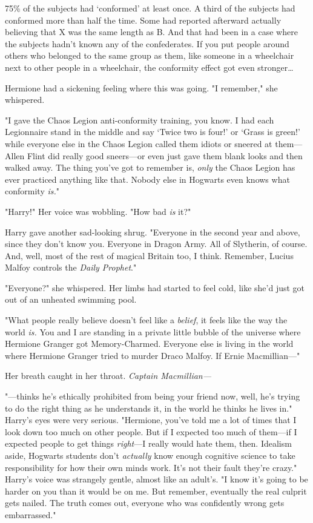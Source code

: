 75\% of the subjects had `conformed' at least once. A third of the subjects had
conformed more than half the time. Some had reported afterward actually
believing that X was the same length as B\@. And that had been in a case where
the subjects hadn't known any of the confederates. If you put people around
others who belonged to the same group as them, like someone in a wheelchair
next to other people in a wheelchair, the conformity effect got even
stronger{\ldots}

Hermione had a sickening feeling where this was going. "I remember," she
whispered.

"I gave the Chaos Legion anti-conformity training, you know. I had each
Legionnaire stand in the middle and say `Twice two is four!' or `Grass is
green!' while everyone else in the Chaos Legion called them idiots or sneered
at them---Allen Flint did really good sneers---or even just gave them blank
looks and then walked away. The thing you've got to remember is, \emph{only}
the Chaos Legion has ever practiced anything like that. Nobody else in Hogwarts
even knows what conformity \emph{is.}"

"Harry!" Her voice was wobbling. "How bad \emph{is} it?"

Harry gave another sad-looking shrug. "Everyone in the second year and above,
since they don't know you. Everyone in Dragon Army. All of Slytherin, of
course. And, well, most of the rest of magical Britain too, I think. Remember,
Lucius Malfoy controls the \emph{Daily Prophet}."

"Everyone?" she whispered. Her limbs had started to feel cold, like she'd just
got out of an unheated swimming pool.

"What people really believe doesn't feel like a \emph{belief}, it feels like
the way the world \emph{is.} You and I are standing in a private little bubble
of the universe where Hermione Granger got Memory-Charmed. Everyone else is
living in the world where Hermione Granger tried to murder Draco Malfoy. If
Ernie Macmillian---"

Her breath caught in her throat. \emph{Captain Macmillian---}

"---thinks he's ethically prohibited from being your friend now, well, he's
trying to do the right thing as he understands it, in the world he thinks he
lives in." Harry's eyes were very serious. "Hermione, you've told me a lot of
times that I look down too much on other people. But if I expected too much of
them---if I expected people to get things \emph{right}---I really would hate
them, then. Idealism aside, Hogwarts students don't \emph{actually} know enough
cognitive science to take responsibility for how their own minds work. It's not
their fault they're crazy." Harry's voice was strangely gentle, almost like an
adult's. "I know it's going to be harder on you than it would be on me. But
remember, eventually the real culprit gets nailed. The truth comes out,
everyone who was confidently wrong gets embarrassed."

